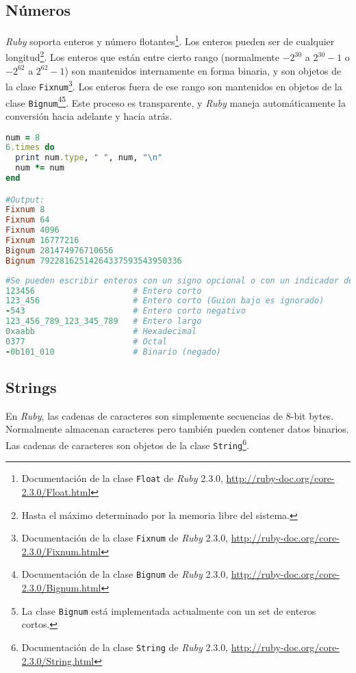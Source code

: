 \subsection{Números}
\textit{Ruby} soporta enteros y número flotantes\footnote{Documentación de la clase \texttt{Float} de \textit{Ruby} 2.3.0, \url{http://ruby-doc.org/core-2.3.0/Float.html}}. Los enteros pueden ser de cualquier longitud\footnote{Hasta el máximo determinado por la memoria libre del sistema.}.
Los enteros que están entre cierto rango (normalmente $-2^{30}$ a $2^{30}-1$ o $-2^{62}$ a $2^{62}-1$) son mantenidos internamente en forma binaria, y son objetos de la clase \texttt{Fixnum}\footnote{Documentación de la clase \texttt{Fixnum} de \textit{Ruby} 2.3.0, \url{http://ruby-doc.org/core-2.3.0/Fixnum.html}}. Los enteros fuera de ese rango son mantenidos en objetos de la clase \texttt{Bignum}\footnote{Documentación de la clase \texttt{Bignum} de \textit{Ruby} 2.3.0, \url{http://ruby-doc.org/core-2.3.0/Bignum.html}}\footnote{La clase \texttt{Bignum} está implementada actualmente con un set de enteros cortos.}. Este proceso es transparente, y \textit{Ruby} maneja automáticamente la conversión hacia adelante y hacia atrás.

\begin{lstlisting}[language=Ruby]
num = 8
6.times do
  print num.type, " ", num, "\n"
  num *= num
end

#Output:
Fixnum 8
Fixnum 64
Fixnum 4096
Fixnum 16777216
Bignum 281474976710656
Bignum 79228162514264337593543950336
\end{lstlisting}

\begin{lstlisting}[language=Ruby]
#Se pueden escribir enteros con un signo opcional o con un indicador de la base.
123456                    # Entero corto
123_456                   # Entero corto (Guion bajo es ignorado)
-543                      # Entero corto negativo
123_456_789_123_345_789   # Entero largo
0xaabb                    # Hexadecimal
0377                      # Octal
-0b101_010                # Binario (negado)
\end{lstlisting}

\subsection{Strings}
En \textit{Ruby}, las cadenas de caracteres son simplemente secuencias de 8-bit bytes. Normalmente almacenan caracteres pero también pueden contener datos binarios. Las cadenas de caracteres son objetos de la clase \texttt{String}\footnote{Documentación de la clase \texttt{String} de \textit{Ruby} 2.3.0, \url{http://ruby-doc.org/core-2.3.0/String.html}}.


